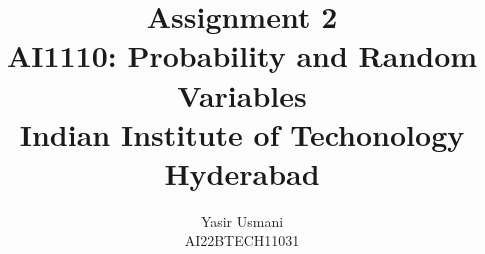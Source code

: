 \documentclass[journal,12pt,onecolumn]{IEEEtran}
\begin{document}
\let\vec\mathbf
\vspace{3cm}
\title{
\textbf {Assignment 2}\\ \large \textbf{AI1110}: Probability and Random Variables\\Indian Institute of Techonology Hyderabad
}
\author{Yasir Usmani\\AI22BTECH11031%
  
 }
%
%
%
% 
%
\end{document}
